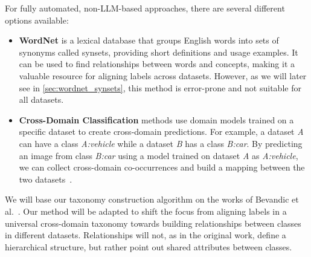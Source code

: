 For fully automated, non-LLM-based approaches, there are several different options available:
\begin{itemize}
    \item \textbf{WordNet} is a lexical database that groups English words into sets of synonyms called synsets, providing short definitions and usage examples.
          It can be used to find relationships between words and concepts, making it a valuable resource for aligning labels across datasets.
          However, as we will later see in \ref{sec:wordnet_synsets}, this method is error-prone and not suitable for all datasets.
    \item \textbf{Cross-Domain Classification} methods use domain models trained on a specific dataset to create cross-domain predictions.
          For example, a dataset \textit{A} can have a class \textit{A:vehicle} while a dataset \textit{B}
          has a class \textit{B:car}. By predicting an image from class \textit{B:car} using a model trained on dataset \textit{A}
          as \textit{A:vehicle}, we can collect cross-domain co-occurrences and build a mapping between the two datasets~\cite{uijlings_missing_2022,bevandic_automatic_2022,bevandic_weakly_2024}.
\end{itemize}

We will base our taxonomy construction algorithm on the works of Bevandic et al.~\cite{bevandic_automatic_2022,bevandic_weakly_2024}.
Our method will be adapted to shift the focus from aligning labels in a universal cross-domain taxonomy
towards building relationships between classes in different datasets.
Relationships will not, as in the original work, define a hierarchical structure,
but rather point out shared attributes between classes.
